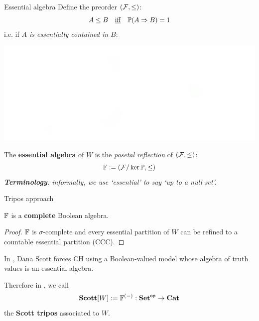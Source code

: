 \begin{frame}{Essential algebra}
	Define the preorder $(\mathcal{F}, \leq)$:
	\begin{equation*}
		A \leq B \quad\text{\underline{iff}}\quad \mathbb{P}(A \Rightarrow B) = 1
	\end{equation*}
	i.e. if \textit{$A$ is essentially contained in $B$}:

	\begin{center}
		\includegraphics[width=.5\columnwidth]{figures/essential-inclusion.png}
	\end{center}

	The \textbf{essential algebra} of $W$ is the \textit{posetal reflection} of $(\mathcal{F}, \leq)$:
	\begin{equation*}
		\mathbb{F} := (\mathcal{F} / \ker \mathbb{P}, \leq)
	\end{equation*}
	\textit{\textbf{Terminology}: informally, we use `essential' to say `up to a null set'.}
\end{frame}

\begin{frame}{Tripos approach}
	\begin{theorem}
		$\mathbb{F}$ is a \textbf{complete} Boolean algebra.
	\end{theorem}
	\begin{proof}
		$\mathbb{F}$ is $\sigma$-complete and every essential partition of $W$ can be refined to a countable essential partition (CCC).
	\end{proof}
	\vfill

	In \cite{scott1967proof}, Dana Scott forces CH using a Boolean-valued model whose algebra of truth values is an essential algebra.

	Therefore in \cite{capucci2020internal}, we call
	\begin{equation*}
		\mathbf{Scott}[W] := \mathbb{F}^{(-)} : \mathbf{Set}^{\mathsf{op}} \to \mathbf{Cat}
	\end{equation*}
	the \textbf{Scott tripos} associated to $W$.
\end{frame}

